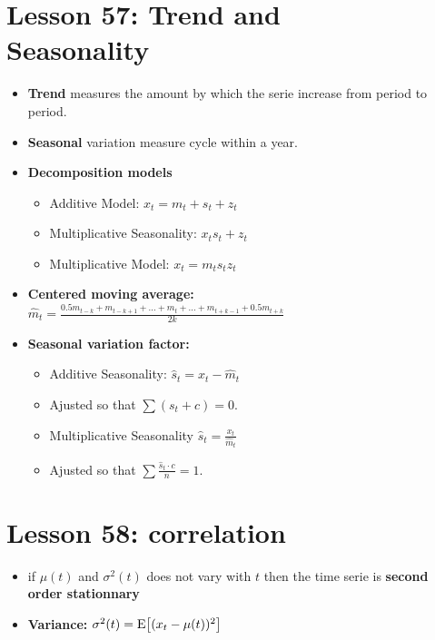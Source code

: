 \documentclass[10pt, french]{article}
\begin{document}
\begin{multicols*}{3}
\section*{Lesson 57: Trend and \\Seasonality}
\begin{itemize}[align=left,leftmargin=*]
  \item \textbf{Trend} measures the amount by which the serie increase from period to period.
  \item \textbf{Seasonal} variation measure cycle within a year.  
  \item \textbf{Decomposition models}
  \begin{itemize}
     \item  Additive Model: $x_t = m_t + s_t + z_t$
     \item Multiplicative Seasonality: $x_t s_t + z_t$
     \item Multiplicative Model: $x_t = m_t s_t z_t$
  \end{itemize}
  \item \textbf{Centered moving average:} \\
  $\hat{m}_t = \frac{0.5m_{t-k} + m_{t-k+1} + ... + m_t + ... + m_{t+k-1} + 0.5m_{t+k}}{2k}$
  \item \textbf{Seasonal variation factor:}  
  \begin{itemize}
     \item Additive Seasonality: $\hat{s}_t = x_t - \hat{m}_t$
     \item[] Ajusted so that $\sum (s_t + c) = 0$.
     \item  Multiplicative Seasonality $\hat{s}_t = \frac{x_t}{\hat{m}_t}$
     \item[] Ajusted so that $\sum \frac{\hat{s}_t \cdot c}{n}= 1$.
  \end{itemize}
\end{itemize}

\section*{Lesson 58: correlation}
\begin{itemize}[align=left,leftmargin=*]
    \item if $\mu(t) $ and $\sigma^2(t)$ does not vary with $t$ then the time serie is \textbf{second order stationnary}
   \item \textbf{Variance:} $\sigma^2(t) = \mathrm{E} {\left[ (x_t -       \mu(t))^2 \right]}$
\end{itemize}

\end{multicols*}
\end{document}
